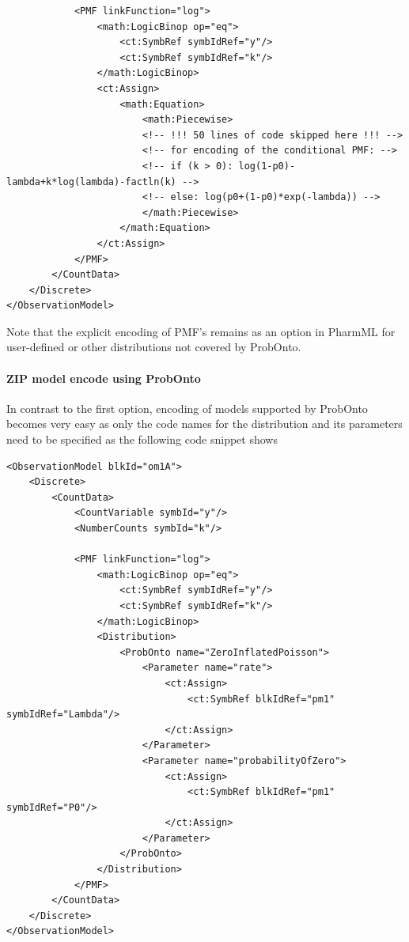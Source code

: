 {\begin{lstlisting}
            <PMF linkFunction="log">
                <math:LogicBinop op="eq">
                    <ct:SymbRef symbIdRef="y"/>
                    <ct:SymbRef symbIdRef="k"/>
                </math:LogicBinop>
                <ct:Assign>
                    <math:Equation>
                        <math:Piecewise>
                        <!-- !!! 50 lines of code skipped here !!! -->
                        <!-- for encoding of the conditional PMF: -->
                        <!-- if (k > 0): log(1-p0)-lambda+k*log(lambda)-factln(k) -->
                        <!-- else: log(p0+(1-p0)*exp(-lambda)) -->
                        </math:Piecewise>
                    </math:Equation>
                </ct:Assign>
            </PMF>
        </CountData>
    </Discrete>
</ObservationModel>
\end{lstlisting}
Note that \marginpar{\HandCuffLeft} the explicit encoding of PMF's remains
as an option in PharmML for user-defined or other distributions not covered by ProbOnto.
        
\paragraph{ZIP model encode using ProbOnto}
In contrast to the first option, encoding of models supported by ProbOnto
becomes very easy as only the code names for the distribution and its parameters 
need to be specified as the following code snippet shows

\lstset{language=XML}
\begin{lstlisting}
<ObservationModel blkId="om1A">
    <Discrete>
        <CountData>
            <CountVariable symbId="y"/>
            <NumberCounts symbId="k"/>
            
            <PMF linkFunction="log">
                <math:LogicBinop op="eq">
                    <ct:SymbRef symbIdRef="y"/>
                    <ct:SymbRef symbIdRef="k"/>
                </math:LogicBinop>
                <Distribution>
                    <ProbOnto name="ZeroInflatedPoisson">
                        <Parameter name="rate">
                            <ct:Assign>
                                <ct:SymbRef blkIdRef="pm1" symbIdRef="Lambda"/>
                            </ct:Assign>
                        </Parameter>
                        <Parameter name="probabilityOfZero">
                            <ct:Assign>
                                <ct:SymbRef blkIdRef="pm1" symbIdRef="P0"/>
                            </ct:Assign>
                        </Parameter>
                    </ProbOnto>
                </Distribution>
            </PMF>
        </CountData>
    </Discrete>
</ObservationModel>\end{lstlisting}

}
